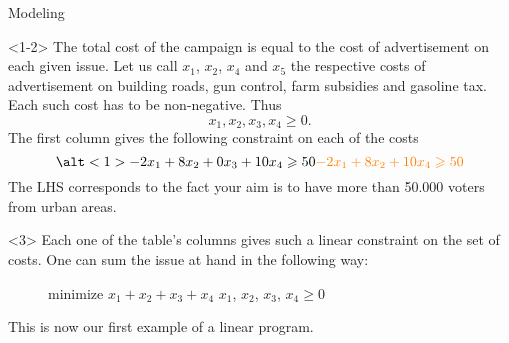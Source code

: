 \documentclass[aspectratio = 169]{beamer}
\begin{document}
\begin{frame}{Modeling}
    \begin{onlyenv}<1-2>
      The total cost of the campaign is equal to the cost of
      advertisement on each given issue. Let us call $x_1$, $x_2$,
      $x_4$ and $x_5$ the respective costs of advertisement on building
      roads, gun control, farm subsidies and gasoline tax. Each such
      cost has to be non-negative. Thus
        \begin{equation}
            \label{eq:positivityCondition}
            x_1, x_2, x_3, x_4 \geqslant 0.
        \end{equation}
        The first column gives the following constraint on each of the
        costs
        \begin{equation}
            \alt<1>{-2x_1 + 8x_2 + 0x_3 + 10x_4 \geqslant 50}{\textcolor{orange}{-2x_1 + 8x_2 + 10x_4 \geqslant 50}}
        \end{equation}
        The LHS corresponds to the fact your aim is to have more than
        50.000 voters from urban areas.
    \end{onlyenv}
    \begin{onlyenv}<3>
      Each one of the table's columns gives such a linear constraint
      on the set of costs. One can sum the issue at hand in the
      following way:
        \begin{figure}
            \begin{linearProg}{
                minimize
                }{
                $x_1+x_2+x_3+x_4$
                }{
                }{
                $x_1$, $x_2$, $x_3$, $x_4 \geq 0$
                }
            \end{linearProg}
        \end{figure}
    This is now our first example of a linear program.
    \end{onlyenv}
\end{frame}
\end{document}
